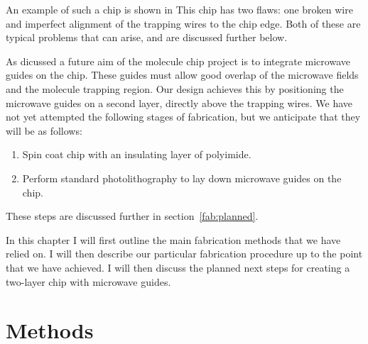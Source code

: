 An example of such a chip is shown in  This chip has two flaws: one broken wire
 and imperfect alignment of the trapping wires
to the chip edge. Both of these are typical problems that can arise, and are
discussed further below.

As dicussed  a future aim of the molecule chip project is to
integrate microwave guides on the chip. These guides must allow good overlap of
the microwave fields and the molecule trapping region. Our design achieves this
by positioning the microwave guides on a second layer, directly above the
trapping wires.  We have not yet attempted the following stages of
fabrication, but we anticipate that they will be as follows:
\begin{enumerate}[resume]
    \item Spin coat chip with an insulating layer of polyimide.
    \item Perform standard photolithography to lay down microwave guides on the
      chip.
\end{enumerate}
These steps are discussed further in section~\ref{fab:planned}.

In this chapter I will first outline the main fabrication methods that we have
relied on. I will then describe our particular fabrication procedure up to the
point that we have achieved. I will then discuss the planned next steps for
creating a two-layer chip with microwave guides.

\section{Methods}

